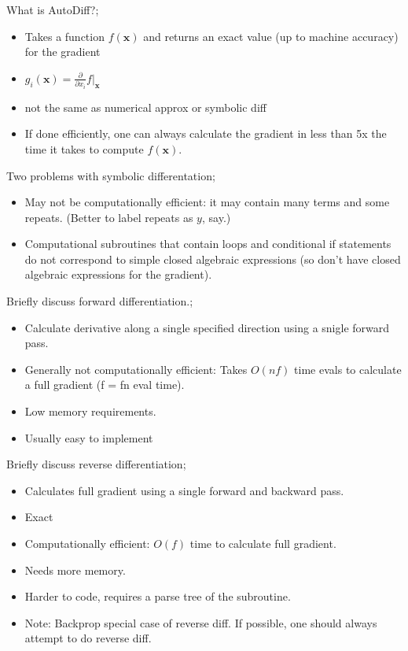 \documentclass{article}
\begin{document}
What is AutoDiff?; \begin{itemize}
	\item Takes a function $f(\mathbf{x})$ and returns an exact value (up to machine accuracy) for the gradient 
	\item $g_i(\mathbf{x})=\frac{\partial}{\partial x_i}f\vert_{\mathbf{x}}$
	\item not the same as numerical approx or symbolic diff
	\item If done efficiently, one can always calculate the gradient in less than 5x the time it takes to compute $f(\mathbf{x})$.
\end{itemize}

Two problems with symbolic differentation; \begin{itemize}
	\item May not be computationally efficient: it may contain many terms and some repeats. (Better to label repeats as $y$, say.)
	\item Computational subroutines that contain loops and conditional if statements do not correspond to simple closed algebraic expressions (so don't have closed algebraic expressions for the gradient).
\end{itemize}

Briefly discuss forward differentiation.; \begin{itemize}
	\item Calculate derivative along a single specified direction using a snigle forward pass.
	\item Generally not computationally efficient: Takes $O(nf)$ time evals to calculate a full gradient (f = fn eval time).
	\item Low memory requirements.
	\item Usually easy to implement
\end{itemize}

Briefly discuss reverse differentiation; \begin{itemize}
	\item Calculates full gradient using a single forward and backward pass.
	\item Exact
	\item Computationally efficient: $O(f)$ time to calculate full gradient.
	\item Needs more memory.
	\item Harder to code, requires a parse tree of the subroutine.
	\item Note: Backprop special case of reverse diff. If possible, one should always attempt to do reverse diff.
\end{itemize}
\end{document}
